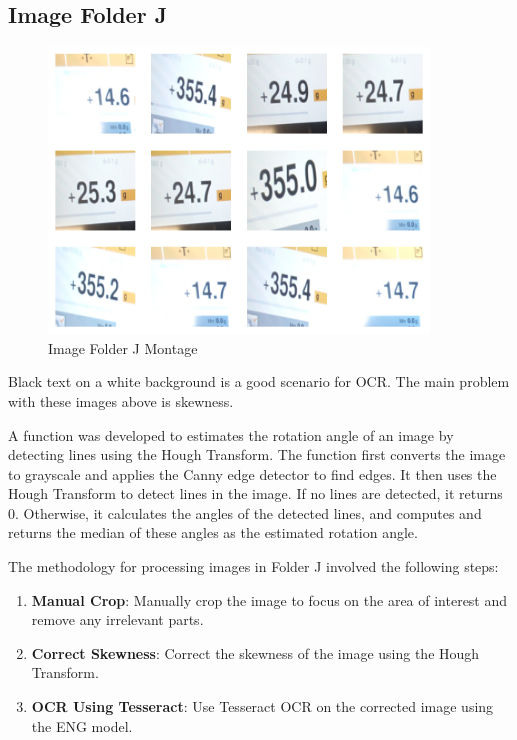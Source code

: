 \newpage
\subsection{Image Folder J}

\begin{figure}[ht]
    \centering
    \includegraphics[width=0.9\textwidth]{Figures/EDA_Charts/11/montage.png}
    \caption[Image Folder J Montage]{Image Folder J Montage}
    \label{fig:Image Folder J Montage}
\end{figure}

Black text on a white background is a good scenario for OCR. The main problem with these images above is skewness.

A function was developed to estimates the rotation angle of an image by detecting lines using the Hough Transform. \cite{mukhopadhyaySurveyHoughTransform2015} The function first converts the image to grayscale and applies the Canny edge detector to find edges. It then uses the Hough Transform to detect lines in the image. If no lines are detected, it returns 0. Otherwise, it calculates the angles of the detected lines, and computes and returns the median of these angles as the estimated rotation angle.

The methodology for processing images in Folder J involved the following steps:

\begin{enumerate}
    \item \textbf{Manual Crop}: Manually crop the image to focus on the area of interest and remove any irrelevant parts.
    \item \textbf{Correct Skewness}: Correct the skewness of the image using the Hough Transform.
    \item \textbf{OCR Using Tesseract}: Use Tesseract OCR on the corrected image using the ENG model.

\end{enumerate}


